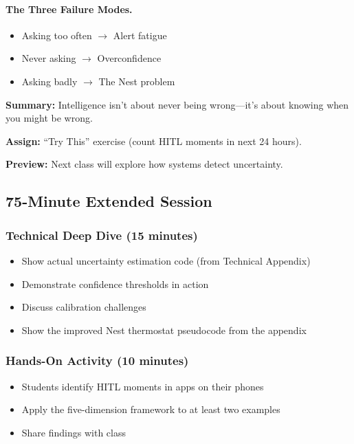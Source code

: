 \paragraph{The Three Failure Modes.}
\begin{itemize}
    \item Asking too often $\rightarrow$ Alert fatigue
    \item Never asking $\rightarrow$ Overconfidence
    \item Asking badly $\rightarrow$ The Nest problem
\end{itemize}

\textbf{Summary:} Intelligence isn't about never being wrong---it's about knowing when you might be wrong.

\textbf{Assign:} ``Try This'' exercise (count HITL moments in next 24 hours).

\textbf{Preview:} Next class will explore how systems detect uncertainty.

\subsection{75-Minute Extended Session}

\subsubsection{Technical Deep Dive (15 minutes)}
\begin{itemize}
    \item Show actual uncertainty estimation code (from Technical Appendix)
    \item Demonstrate confidence thresholds in action
    \item Discuss calibration challenges
    \item Show the improved Nest thermostat pseudocode from the appendix
\end{itemize}

\subsubsection{Hands-On Activity (10 minutes)}
\begin{itemize}
    \item Students identify HITL moments in apps on their phones
    \item Apply the five-dimension framework to at least two examples
    \item Share findings with class
\end{itemize}

